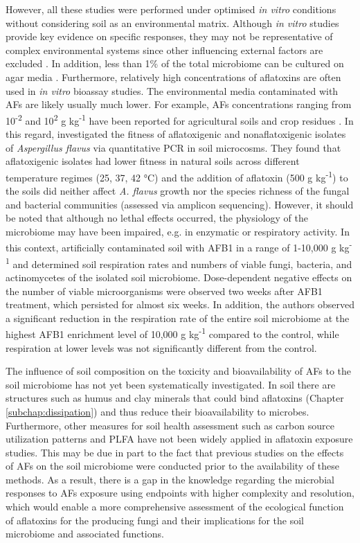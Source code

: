 However, all these studies were performed under optimised \textit{in vitro} conditions without considering soil as an environmental matrix. Although \textit{in vitro} studies provide key evidence on specific responses, they may not be representative of complex environmental systems since other influencing external factors are excluded \citep{drott2019fitness}. In addition, less than 1\% of the total microbiome can be cultured on agar media \citep{pham2012cultivation}. Furthermore, relatively high concentrations of aflatoxins are often used in \textit{in vitro} bioassay studies. The environmental media contaminated with AFs are likely usually much lower. For example, AFs concentrations ranging from 10\textsuperscript{-2} and 10\textsuperscript{2} \textmu g kg\textsuperscript{-1} have been reported for agricultural soils and crop residues \citep{accinelli2008aspergillus}. In this regard, \citet{drott2019fitness} investigated the fitness of aflatoxigenic and nonaflatoxigenic isolates of \textit{Aspergillus flavus} via quantitative PCR in soil microcosms. They found that aflatoxigenic isolates had lower fitness in natural soils across different temperature regimes (25, 37, 42 °C) and the addition of aflatoxin (500 \textmu g kg\textsuperscript{-1}) to the soils did neither affect \textit{A. flavus} growth nor the species richness of the fungal and bacterial communities (assessed via amplicon sequencing). However, it should be noted that although no lethal effects occurred, the physiology of the microbiome may have been impaired, e.g. in enzymatic or respiratory activity. In this context, \citet{angle1981aflatoxin} artificially contaminated soil with AFB1 in a range of 1-10,000 \textmu g kg\textsuperscript{-1} and determined soil respiration rates and numbers of viable fungi, bacteria, and actinomycetes of the isolated soil microbiome. Dose-dependent negative effects on the number of viable microorganisms were observed two weeks after AFB1 treatment, which persisted for almost six weeks. In addition, the authors observed a significant reduction in the respiration rate of the entire soil microbiome at the highest AFB1 enrichment level of 10,000 \textmu g kg\textsuperscript{-1} compared to the control, while respiration at lower levels was not significantly different from the control. 


The influence of soil composition on the toxicity and bioavailability of AFs to the soil microbiome has not yet been systematically investigated. In soil there are structures such as humus and clay minerals that could bind aflatoxins (Chapter \ref{subchap:dissipation}) and thus reduce their bioavailability to microbes. Furthermore, other measures for soil health assessment such as carbon source utilization patterns and PLFA have not been widely applied in aflatoxin exposure studies. This may be due in part to the fact that previous studies on the effects of AFs on the soil microbiome were conducted prior to the availability of these methods. As a result, there is a gap in the knowledge regarding the microbial responses to AFs exposure using endpoints with higher complexity and resolution, which would enable a more comprehensive assessment of the ecological function of aflatoxins for the producing fungi and their implications for the soil microbiome and associated functions.


